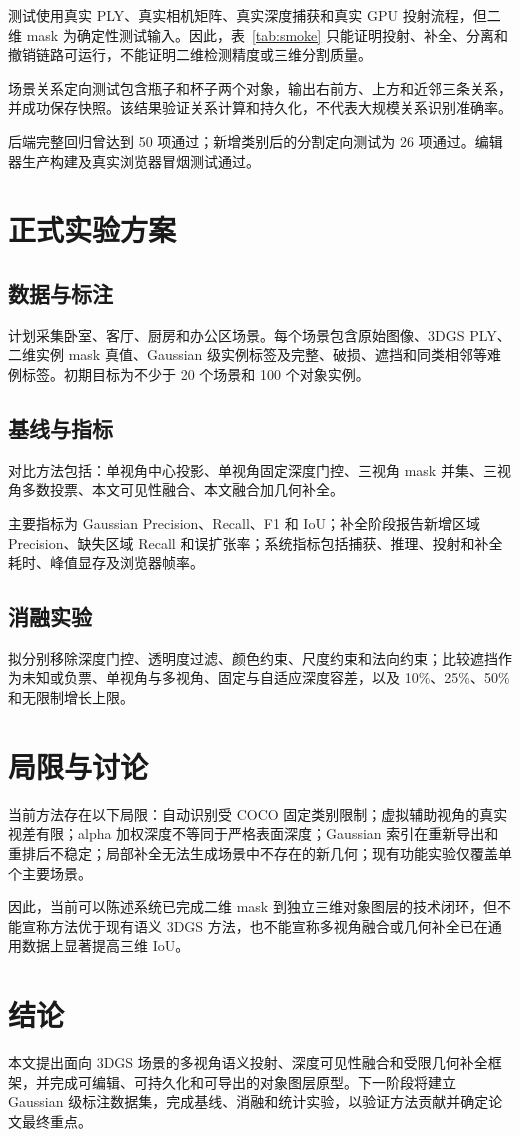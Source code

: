 \documentclass[10pt,twocolumn]{ctexart}
\begin{document}
测试使用真实 PLY、真实相机矩阵、真实深度捕获和真实 GPU 投射流程，但二维 mask 为确定性测试输入。因此，表~\ref{tab:smoke} 只能证明投射、补全、分离和撤销链路可运行，不能证明二维检测精度或三维分割质量。

场景关系定向测试包含瓶子和杯子两个对象，输出右前方、上方和近邻三条关系，并成功保存快照。该结果验证关系计算和持久化，不代表大规模关系识别准确率。

后端完整回归曾达到 50 项通过；新增类别后的分割定向测试为 26 项通过。编辑器生产构建及真实浏览器冒烟测试通过。

\section{正式实验方案}

\subsection{数据与标注}

计划采集卧室、客厅、厨房和办公区场景。每个场景包含原始图像、3DGS PLY、二维实例 mask 真值、Gaussian 级实例标签及完整、破损、遮挡和同类相邻等难例标签。初期目标为不少于 20 个场景和 100 个对象实例。

\subsection{基线与指标}

对比方法包括：单视角中心投影、单视角固定深度门控、三视角 mask 并集、三视角多数投票、本文可见性融合、本文融合加几何补全。

主要指标为 Gaussian Precision、Recall、F1 和 IoU；补全阶段报告新增区域 Precision、缺失区域 Recall 和误扩张率；系统指标包括捕获、推理、投射和补全耗时、峰值显存及浏览器帧率。

\subsection{消融实验}

拟分别移除深度门控、透明度过滤、颜色约束、尺度约束和法向约束；比较遮挡作为未知或负票、单视角与多视角、固定与自适应深度容差，以及 10\%、25\%、50\% 和无限制增长上限。

\section{局限与讨论}

当前方法存在以下局限：自动识别受 COCO 固定类别限制；虚拟辅助视角的真实视差有限；alpha 加权深度不等同于严格表面深度；Gaussian 索引在重新导出和重排后不稳定；局部补全无法生成场景中不存在的新几何；现有功能实验仅覆盖单个主要场景。

因此，当前可以陈述系统已完成二维 mask 到独立三维对象图层的技术闭环，但不能宣称方法优于现有语义 3DGS 方法，也不能宣称多视角融合或几何补全已在通用数据上显著提高三维 IoU。

\section{结论}

本文提出面向 3DGS 场景的多视角语义投射、深度可见性融合和受限几何补全框架，并完成可编辑、可持久化和可导出的对象图层原型。下一阶段将建立 Gaussian 级标注数据集，完成基线、消融和统计实验，以验证方法贡献并确定论文最终重点。



\end{document}
